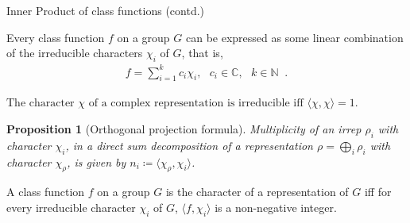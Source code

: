 \documentclass{beamer}
\newtheorem{proposition}{Proposition}
\begin{document}
\begin{frame}{Inner Product of class functions (contd.)}
    \begin{corollary}
        Every class function $f$ on a group $G$ can be expressed as some linear combination of the irreducible characters $\chi_i$ of $G$, that is,
        \vspace{-1em}
        \begin{align*}
            f=\sum\limits_{i=1}^{k} c_i {\chi}_i,\text{ }c_i\in\mathbb{C},\text{ }k\in\mathbb{N}\;\;. 
        \end{align*}
    \end{corollary}
    \vspace{-0.35em}
    \begin{corollary}
        $\text{The character $\chi$ of a complex representation is irreducible iff } \langle\chi,\chi\rangle=1$.
    \end{corollary}
    \vspace{-0.35em}
    \begin{proposition}[Orthogonal projection formula]
        Multiplicity of an irrep $\rho_i$ with character $\chi_i$, in a direct sum decomposition of a representation $\rho=\bigoplus\limits_{i}\rho_i$ with character $\chi_{\rho}$, is given by $n_i\coloneqq\langle\chi_{\rho},\chi_i\rangle$.
    \end{proposition}
    \vspace{-0.35em}
    \begin{lemma}
        A class function $f$ on a group $G$ is the character of a representation of $G$ iff for every irreducible character $\chi_i$ of $G$, $\langle f,\chi_{i}\rangle$ is a non-negative integer.
    \end{lemma}
\end{frame}
\end{document}

